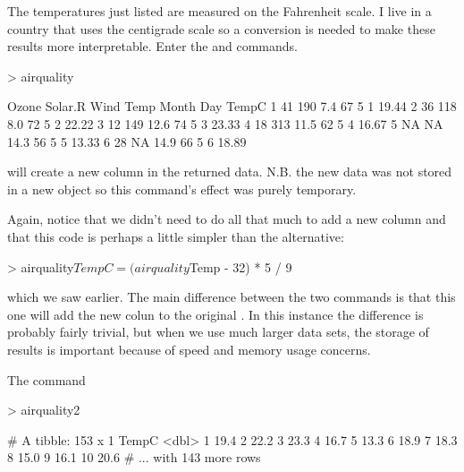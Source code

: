 The temperatures just listed are measured on the Fahrenheit scale. I live in a country that uses the centigrade scale so a conversion is needed to make these results more interpretable. Enter the  and  
 commands.  
 

\begin{Schunk}
\begin{Sinput}
> airquality %>% mutate(TempC = (Temp - 32) * 5 / 9) %>% head() 
\end{Sinput}
\begin{Soutput}
  Ozone Solar.R Wind Temp Month Day TempC
1    41     190  7.4   67     5   1 19.44
2    36     118  8.0   72     5   2 22.22
3    12     149 12.6   74     5   3 23.33
4    18     313 11.5   62     5   4 16.67
5    NA      NA 14.3   56     5   5 13.33
6    28      NA 14.9   66     5   6 18.89
\end{Soutput}
\end{Schunk}

will create a new column in the returned data. N.B. the new data was not stored in a new object so this command's effect was purely temporary. 
 
Again, notice that we didn't need to do all that much to add a new column and that this code is perhaps a little simpler than the alternative: 

\begin{Schunk}
\begin{Sinput}
> airquality$TempC = (airquality$Temp - 32) * 5 / 9 
\end{Sinput}
\end{Schunk}

which we saw earlier. The main difference between the two commands is that this one will add the new colun to the original . 
In this instance the difference is probably fairly trivial, but when we use much larger data sets, the storage of results is important because of speed and memory usage concerns. 
 
The command 

\begin{Schunk}
\begin{Sinput}
> airquality2 %>% transmute(TempC = (Temp - 32) * 5 / 9) 
\end{Sinput}
\begin{Soutput}
# A tibble: 153 x 1
   TempC
   <dbl>
 1  19.4
 2  22.2
 3  23.3
 4  16.7
 5  13.3
 6  18.9
 7  18.3
 8  15.0
 9  16.1
10  20.6
# ... with 143 more rows
\end{Soutput}
\end{Schunk}

